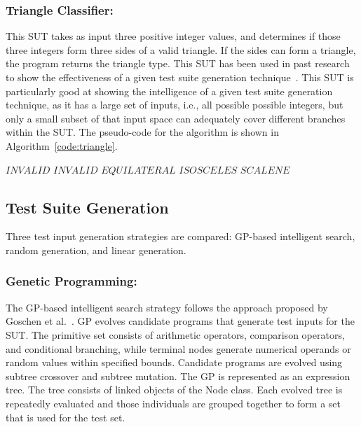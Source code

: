 \documentclass[runningheads]{llncs}
\begin{document}
\subsubsection{Triangle Classifier:} 
This SUT takes as input three positive integer values, and determines if those three integers form three sides of a valid triangle. If the sides can form a triangle, the program returns the triangle type. This SUT has been used in past research to show the effectiveness of a given test suite generation technique~\cite{xiao2007empirical}. This SUT is particularly good at showing the intelligence of a given test suite generation technique, as it has a large set of inputs, i.e., all possible possible integers, but only a small subset of that input space can adequately cover different branches within the SUT. The pseudo-code for the algorithm is shown in Algorithm~\ref{code:triangle}.

\begin{center}
\begin{algorithm}[!htb]
\label{code:triangle}
\scriptsize
\begin{algorithmic}[1]
    \State \Return $INVALID$
\EndIf
{}
    \State \Return $INVALID$
\EndIf
{}
    \State \Return $EQUILATERAL$
    \State \Return $ISOSCELES$
\Else
    \State \Return $SCALENE$
\EndIf
\end{algorithmic}    
\end{algorithm}
\end{center}
\subsection{Test Suite Generation}

Three test input generation strategies are compared: GP-based intelligent search, random generation, and linear generation.

\subsubsection{Genetic Programming:}

The GP-based intelligent search strategy follows the approach proposed by Goschen et al.~\cite{goschen2022genetic}. GP evolves candidate programs that generate test inputs for the SUT. The primitive set consists of arithmetic operators, comparison operators, and conditional branching, while terminal nodes generate numerical operands or random values within specified bounds. Candidate programs are evolved using subtree crossover and subtree mutation. The GP is represented as an expression tree. The tree consists of linked objects of the Node class. Each evolved tree is repeatedly evaluated and those individuals are grouped together to form a set that is used for the test set.
\end{document}
